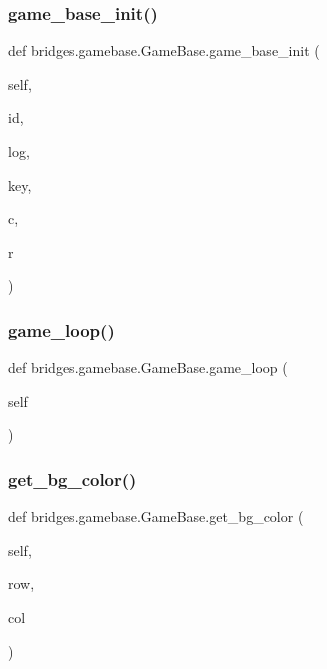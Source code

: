 \subsubsection{\texorpdfstring{game\_base\_init()}{game\_base\_init()}}
{\footnotesize\ttfamily def bridges.\+gamebase.\+Game\+Base.\+game\+\_\+base\+\_\+init (\begin{DoxyParamCaption}\item[{}]{self,  }\item[{}]{id,  }\item[{}]{log,  }\item[{}]{key,  }\item[{}]{c,  }\item[{}]{r }\end{DoxyParamCaption})}

\mbox{\label{classbridges_1_1gamebase_1_1_game_base_af650eeb756558d2cbcae43c74de5cce7}} 
\subsubsection{\texorpdfstring{game\_loop()}{game\_loop()}}
{\footnotesize\ttfamily def bridges.\+gamebase.\+Game\+Base.\+game\+\_\+loop (\begin{DoxyParamCaption}\item[{}]{self }\end{DoxyParamCaption})}

\mbox{\label{classbridges_1_1gamebase_1_1_game_base_a2e1fd4365bf805a85c19bef1eb197b22}} 
\subsubsection{\texorpdfstring{get\_bg\_color()}{get\_bg\_color()}}
{\footnotesize\ttfamily def bridges.\+gamebase.\+Game\+Base.\+get\+\_\+bg\+\_\+color (\begin{DoxyParamCaption}\item[{}]{self,  }\item[{}]{row,  }\item[{}]{col }\end{DoxyParamCaption})}



